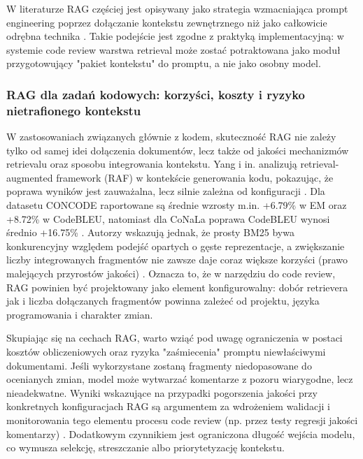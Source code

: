 W literaturze RAG częściej jest opisywany jako strategia wzmacniająca prompt engineering poprzez dołączanie kontekstu
zewnętrznego niż jako całkowicie odrębna technika \cite{syahputri2025prompt}. Takie podejście jest zgodne z praktyką
implementacyjną: w systemie code review warstwa retrieval może zostać potraktowana jako moduł przygotowujący "pakiet kontekstu" do 
promptu, a nie jako osobny model.

\subsubsection{RAG dla zadań kodowych: korzyści, koszty i ryzyko nietrafionego kontekstu}
W zastosowaniach związanych głównie z kodem, skuteczność RAG nie zależy tylko od samej idei dołączenia dokumentów, lecz
także od jakości mechanizmów retrievalu oraz sposobu integrowania kontekstu. Yang i in. analizują retrieval-augmented framework (RAF)
w kontekście generowania kodu, pokazując, że poprawa wyników jest zauważalna, lecz silnie zależna od konfiguracji \cite{yang2025ragcodegen}.
Dla datasetu CONCODE raportowane są średnie wzrosty m.in. \mbox{+6.79\%} w EM oraz 
\mbox{+8.72\%} w CodeBLEU, natomiast dla CoNaLa poprawa CodeBLEU wynosi średnio \mbox{+16.75\%} \cite{yang2025ragcodegen}.
Autorzy wskazują jednak, że prosty BM25 bywa konkurencyjny względem podejść opartych o gęste reprezentacje, a zwiększanie
liczby integrowanych fragmentów nie zawsze daje coraz większe korzyści (prawo malejących przyrostów jakości) \cite{yang2025ragcodegen}.
Oznacza to, że w narzędziu do code review, RAG powinien być projektowany jako element konfigurowalny: dobór retrievera jak i
liczba dołączanych fragmentów powinna zależeć od projektu, języka programowania i charakter zmian.

Skupiając się na cechach RAG, warto wziąć pod uwagę ograniczenia w postaci kosztów obliczeniowych oraz ryzyka "zaśmiecenia"
promptu niewłaściwymi dokumentami. Jeśli wykorzystane zostaną fragmenty niedopasowane do ocenianych zmian, model może wytwarzać
komentarze z pozoru wiarygodne, lecz nieadekwatne. Wyniki wskazujące na przypadki pogorszenia jakości przy
konkretnych konfiguracjach RAG są argumentem za wdrożeniem walidacji i monitorowania tego elementu procesu code review
(np. przez testy regresji jakości komentarzy) \cite{yang2025ragcodegen}. Dodatkowym czynnikiem jest ograniczona długość 
wejścia modelu, co wymusza selekcję, streszczanie albo priorytetyzację kontekstu.

